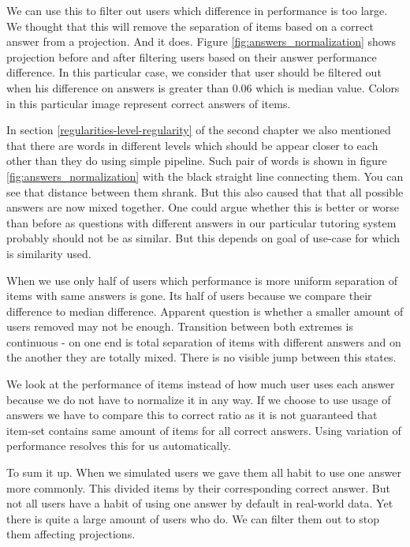 \documentclass[
  digital, %
  table,   %
  nolof,     %
  nolot,     %
  nocover
]{fithesis3}
\begin{document}
We can use this to filter out users which difference in performance is too large. We thought that this will remove the separation of items based on a correct answer from a projection. And it does. Figure \ref{fig:answers_normalization} shows projection before and after filtering users based on their answer performance difference. In this particular case, we consider that user should be filtered out when his difference on answers is greater than 0.06 which is median value. Colors in this particular image represent correct answers of items.

In section \ref{regularities-level-regularity} of the second chapter we also mentioned that there are words in different levels which should be appear closer to each other than they do using simple pipeline. Such pair of words is shown in figure \ref{fig:answers_normalization} with the black straight line connecting them. You can see that distance between them shrank. But this also caused that that all possible answers are now mixed together. One could argue whether this is better or worse than before as questions with different answers in our particular tutoring system probably should not be as similar. But this depends on goal of use-case for which is similarity used.


When we use only half of users which performance is more uniform separation of items with same answers is gone. Its half of users because we compare their difference to median difference. Apparent question is whether a smaller amount of users removed may not be enough. Transition between both extremes is continuous - on one end is total separation of items with different answers and on the another they are totally mixed. There is no visible jump between this states.

We look at the performance of items instead of how much user uses each answer because we do not have to normalize it in any way. If we choose to use usage of answers we have to compare this to correct ratio as it is not guaranteed that item-set contains same amount of items for all correct answers. Using variation of performance resolves this for us automatically.


To sum it up. When we simulated users we gave them all habit to use one answer more commonly. This divided items by their corresponding correct answer. But not all users have a habit of using one answer by default in real-world data. Yet there is quite a large amount of users who do. We can filter them out to stop them affecting projections.
\end{document}
